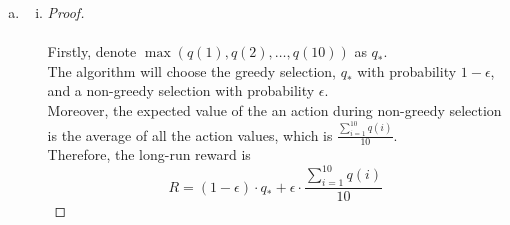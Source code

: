 \documentclass{article}
\begin{document}
\begin{enumerate}[a)]
\begin{enumerate}[i)]
\begin{proof}
            Therefore, the probability that the greedy action was chosen for the first time at time $T$ is:
            \begin{equation*}
                \begin{aligned}
                    P(\text{greedy at } T) &= P(\text{not greedy before } T) \cdot P(\text{greedy at } T)\\
                    &= \left(1 - 1 + \epsilon - \frac{\epsilon}{k}\right)^{T - 1} \cdot \left(1 - \epsilon + \frac{\epsilon}{k}\right)\\
                    &= \left(\epsilon - \frac{\epsilon}{k}\right)^{T - 1} \cdot \left(1 - \epsilon + \frac{\epsilon}{k}\right)\\
                \end{aligned}
            \end{equation*}\par
        \end{proof}

    \item \begin{proof}
        \renewcommand{\qedsymbol}{$\blacksquare$}
        \hfill\\\\
        To get the expected number of steps, $\mathbb{E}[T]$, until a greedy action is chosen, we can consider $P(\text{greedy action})$ as a geometric series.
        Therefore, the expected number of steps until a greedy action is chosen is:
        \begin{equation*}
            \mathbb{E}[T] = \frac{1}{1-\epsilon + \frac{\epsilon}{k}}
        \end{equation*}
    \end{proof}
    \end{enumerate}
    \item 
    \begin{enumerate}[i)]
        \item 
        \begin{proof}
            \renewcommand{\qedsymbol}{$\blacksquare$}
            \hfill\\\\
            Firstly, denote $\max(q(1), q(2), \dots, q(10))$ as $q_{*}$.\\
            The algorithm will choose the greedy selection, $q_{*}$ with probability $1 - \epsilon$, and a non-greedy selection with probability $\epsilon$.\\
            Moreover, the expected value of the an action during non-greedy selection is the average of all the action values, which is $\frac{\sum_{i = 1}^{10} q(i)}{10}$.\\
            Therefore, the long-run reward is 
            \begin{equation*}
                R = (1 - \epsilon) \cdot q_{*} + \epsilon \cdot \frac{\sum_{i = 1}^{10} q(i)}{10}
            \end{equation*}\par 
        \end{proof}
        

\end{enumerate}
\end{enumerate}
\end{document}
